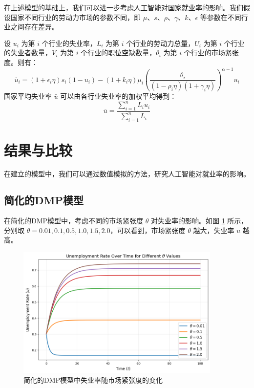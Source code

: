 \documentclass{article}
\begin{document}
在上述模型的基础上，我们可以进一步考虑人工智能对国家就业率的影响。我们假设国家不同行业的劳动力市场的参数不同，即 $\mu$、$s$、$\rho$、$\gamma$、$k$、$\epsilon$ 等参数在不同行业之间存在差异。

设 $u_i$ 为第 $i$ 个行业的失业率，$L_i$ 为第 $i$ 个行业的劳动力总量，$U_i$ 为第 $i$ 个行业的失业者数量，$V_i$ 为第 $i$ 个行业的职位空缺数量，$\theta_i$ 为第 $i$ 个行业的市场紧张度。则有：
\begin{equation}
    \dot{u_i} = (1 + \epsilon_i\eta)s_i(1 - u_i) - (1 + k_i\eta)\mu_i \left(\frac{\theta_i}{(1 - \rho_i\eta)(1 + \gamma_i\eta)}\right)^{\alpha-1} u_i
\end{equation}
国家平均失业率 $\bar{u}$ 可以由各行业失业率的加权平均得到：
\begin{equation}
    \bar{u} = \frac{\sum_{i=1}^n L_i u_i}{\sum_{i=1}^n L_i}
\end{equation}

\section{结果与比较}

在建立的模型中，我们可以通过数值模拟的方法，研究人工智能对就业率的影响。

\subsection{简化的DMP模型}

在简化的DMP模型中，考虑不同的市场紧张度 $\theta$ 对失业率的影响。如图 \ref{fig:simple_dmp} 所示，分别取 $\theta = 0.01, 0.1, 0.5, 1.0, 1.5, 2.0$，可以看到，市场紧张度 $\theta$ 越大，失业率 $u$ 越高。

\begin{figure}[H]
\centering
\includegraphics[width=0.9\textwidth]{img/simple_dmp.png}
\caption{简化的DMP模型中失业率随市场紧张度的变化}
\label{fig:simple_dmp}
\end{figure}

{}
\printbibliography[title={参考文献}]
\end{document}
